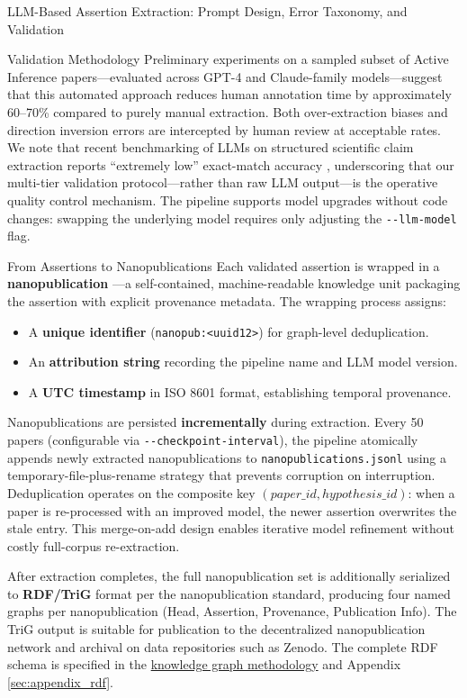 \documentclass[
  ignorenonframetext,
]{beamer}
\providecommand{\tightlist}{%
  \setlength{\itemsep}{0pt}\setlength{\parskip}{0pt}}
\begin{document}
\begin{frame}[fragile]{LLM-Based Assertion Extraction: Prompt Design,
Error Taxonomy, and Validation \label{sec:extraction_pipeline}}
\begin{block}{Validation Methodology}
Preliminary experiments on a sampled subset of Active Inference
papers---evaluated across GPT-4 and Claude-family models---suggest that
this automated approach reduces human annotation time by approximately
60--70\% compared to purely manual extraction. Both over-extraction
biases and direction inversion errors are intercepted by human review at
acceptable rates. We note that recent benchmarking of LLMs on structured
scientific claim extraction reports ``extremely low'' exact-match
accuracy \citep{liang2024survey}, underscoring that our multi-tier
validation protocol---rather than raw LLM output---is the operative
quality control mechanism. The pipeline supports model upgrades without
code changes: swapping the underlying model requires only adjusting the
\texttt{-\/-llm-model} flag.
\end{block}

\begin{block}{From Assertions to Nanopublications}
\protect{}\label{from-assertions-to-nanopublications}
Each validated assertion is wrapped in a \textbf{nanopublication}
\citep{groth2010anatomy, kuhn2016decentralized}---a self-contained,
machine-readable knowledge unit packaging the assertion with explicit
provenance metadata. The wrapping process assigns:

\begin{itemize}
\tightlist
\item
  A \textbf{unique identifier}
  (\texttt{nanopub:\textless{}uuid12\textgreater{}}) for graph-level
  deduplication.
\item
  An \textbf{attribution string} recording the pipeline name and LLM
  model version.
\item
  A \textbf{UTC timestamp} in ISO 8601 format, establishing temporal
  provenance.
\end{itemize}

Nanopublications are persisted \textbf{incrementally} during extraction.
Every 50 papers (configurable via \texttt{-\/-checkpoint-interval}), the
pipeline atomically appends newly extracted nanopublications to
\texttt{nanopublications.jsonl} using a temporary-file-plus-rename
strategy that prevents corruption on interruption. Deduplication
operates on the composite key \((paper\_id, hypothesis\_id)\): when a
paper is re-processed with an improved model, the newer assertion
overwrites the stale entry. This merge-on-add design enables iterative
model refinement without costly full-corpus re-extraction.

After extraction completes, the full nanopublication set is additionally
serialized to \textbf{RDF/TriG} format per the nanopublication standard,
producing four named graphs per nanopublication (Head, Assertion,
Provenance, Publication Info). The TriG output is suitable for
publication to the decentralized nanopublication network and archival on
data repositories such as Zenodo. The complete RDF schema is specified
in the \hyperref[sec:methods_kg]{knowledge graph methodology} and
Appendix \ref{sec:appendix_rdf}.
\end{block}
\end{frame}
\end{document}
